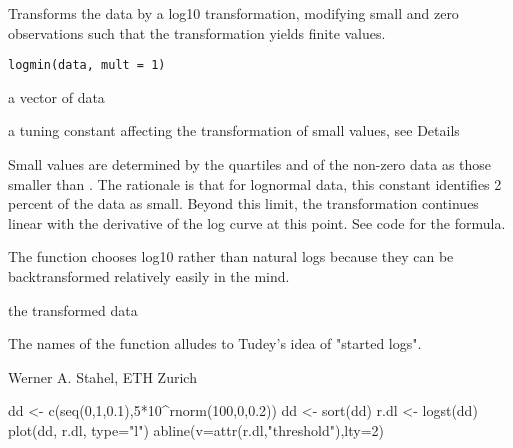 \documentclass{article}
\begin{document}
\begin{Description}\relax
Transforms the data by a log10 transformation, modifying small and zero
observations such that the transformation yields finite values.
\end{Description}
\begin{Usage}
\begin{verbatim}
logmin(data, mult = 1)
\end{verbatim}
\end{Usage}
\begin{Arguments}
\begin{ldescription}
\item[\code{data}] a vector of data
\item[\code{mult}] a tuning constant affecting the transformation of small
values, see Details
\end{ldescription}
\end{Arguments}
\begin{Details}\relax
Small values are determined by the quartiles   and
 of the
non-zero data as those smaller than
.
The rationale is that for lognormal data, this constant identifies
2 percent of the data as small.
Beyond this limit, the transformation continues linear with the
derivative of the log curve at this point. See code for the formula.

The function chooses log10 rather than natural logs because they can
be backtransformed relatively easily in the mind.
\end{Details}
\begin{Value}
the transformed data
\end{Value}
\begin{Note}\relax
The names of the function alludes to Tudey's idea of "started logs".
\end{Note}
\begin{Author}\relax
Werner A. Stahel, ETH Zurich
\end{Author}
\begin{Examples}
\begin{ExampleCode}
dd <- c(seq(0,1,0.1),5*10^rnorm(100,0,0.2))
dd <- sort(dd)
r.dl <- logst(dd)
plot(dd, r.dl, type="l")
abline(v=attr(r.dl,"threshold"),lty=2)
\end{ExampleCode}
\end{Examples}
\end{document}
